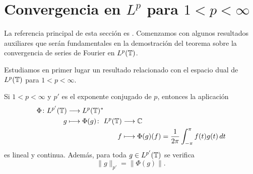 \documentclass[a4paper, 12pt, oneside]{book}
\begin{document}
\section[Convergencia en \texorpdfstring{$L^p$}{Lp} para \texorpdfstring{$1<p<\infty$}{1<p<oo}]{Convergencia en \texorpdfstring{\boldmath$L^p$}{Lp} para \texorpdfstring{\boldmath$1<p<\infty$}{1<p<oo}}

La referencia principal de esta sección es \cite{miao}. Comenzamos con algunos resultados auxiliares que serán fundamentales en la demostración del teorema sobre la convergencia de series de Fourier en $L^p(\mathbb T)$.

Estudiamos en primer lugar un resultado relacionado con el espacio dual de $L^p(\mathbb T)$ para $1<p<\infty$.

\begin{lemma}
    Si $1 < p < \infty$ y $p'$ es el exponente conjugado de $p$, entonces la aplicación
    \[\begin{alignedat}{3}
        \Phi \colon L^{p'}(\mathbb T) &\longrightarrow L^p(\mathbb T)^* & & \\
        g &\longmapsto \Phi(g) \colon & L^p(\mathbb T) &\longrightarrow \mathbb C \\
        & & f &\longmapsto \Phi(g)(f)=\frac{1}{2\pi}\int_{-\pi}^{\pi} f(t)g(t) \, dt
    \end{alignedat}\]
    es lineal y continua. Además, para toda $g \in L^{p'}(\mathbb T)$ se verifica
    \[\|g\|_{p'} = \|\Phi(g)\|.\]
\end{lemma}
\end{document}
